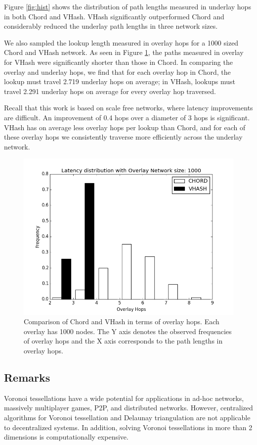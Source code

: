 Figure \ref{fig:hist} shows the distribution of path lengths measured in underlay hops in both Chord and VHash.
VHash significantly outperformed Chord and considerably reduced the underlay path lengths in three network sizes.

We also sampled the lookup length measured in overlay hops for a 1000 sized Chord and VHash network.
As seen in Figure \ref{fig:histover}, the paths measured in overlay for VHash were significantly shorter than those in Chord.
In comparing the overlay and underlay hops, we find that for each overlay hop in Chord, the lookup must travel 2.719 underlay hops on average; in VHash, lookups must travel 2.291 underlay hops on average for every overlay hop traversed.

Recall that this work is based on scale free networks, where latency improvements are difficult.
An improvement of 0.4 hops over a diameter of 3 hops is significant.
VHash has on average less overlay hops per lookup than Chord, and for each of these overlay hops we consistently traverse more efficiently across the underlay network.
\begin{figure}
	\centering
	\includegraphics[width=0.5\linewidth]{figs/hist_overlay_4d}
	\caption{Comparison of Chord and VHash in terms of overlay hops.  Each overlay has 1000 nodes.  The Y axis denotes the observed frequencies of overlay hops and the X axis corresponds to the path lengths in overlay hops.}
	\label{fig:histover}
\end{figure}




\subsection{Remarks}

Voronoi tessellations have a wide potential for applications in ad-hoc networks, massively multiplayer games, P2P, and distributed networks.
However, centralized algorithms for Voronoi tessellation and Delaunay triangulation are not applicable to decentralized systems.
In addition, solving Voronoi tessellations in more than 2 dimensions is computationally expensive.

